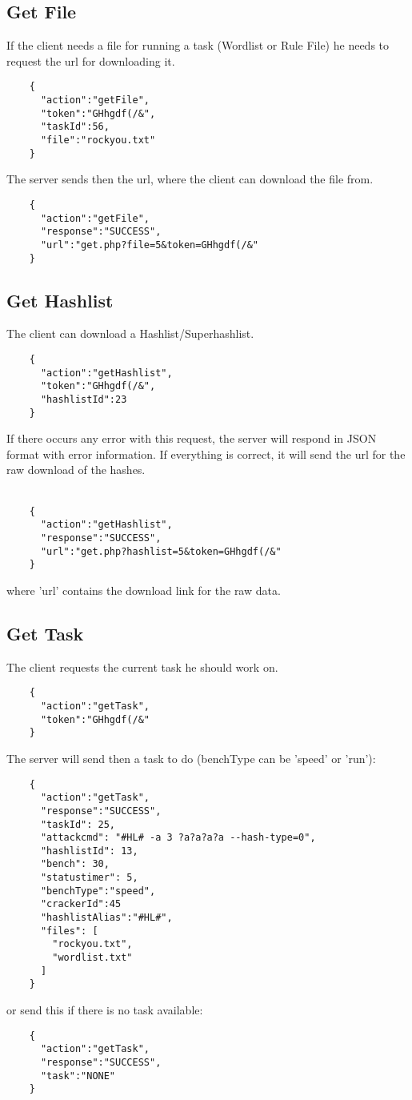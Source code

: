 \documentclass{article}
\begin{document}
	\subsection*{Get File}
	If the client needs a file for running a task (Wordlist or Rule File) he needs to request the url for downloading it.
	\begin{verbatim}
	{
	  "action":"getFile",
	  "token":"GHhgdf(/&",
	  "taskId":56,
	  "file":"rockyou.txt"
	}
	\end{verbatim}
	The server sends then the url, where the client can download the file from.
	\begin{verbatim}
	{
	  "action":"getFile",
	  "response":"SUCCESS",
	  "url":"get.php?file=5&token=GHhgdf(/&"
	}
	\end{verbatim}
	
	\subsection*{Get Hashlist}
	The client can download a Hashlist/Superhashlist.
	\begin{verbatim}
	{
	  "action":"getHashlist",
	  "token":"GHhgdf(/&",
	  "hashlistId":23
	}
	\end{verbatim}
	If there occurs any error with this request, the server will respond in JSON format with error information. If everything is correct, it will send the url for the raw download of the hashes.\\\\
	\begin{verbatim}
	{
	  "action":"getHashlist",
	  "response":"SUCCESS",
	  "url":"get.php?hashlist=5&token=GHhgdf(/&"
	}
	\end{verbatim}
	where 'url' contains the download link for the raw data.
	
	\subsection*{Get Task}
	The client requests the current task he should work on.
	\begin{verbatim}
	{
	  "action":"getTask",
	  "token":"GHhgdf(/&"
	}
	\end{verbatim}
	The server will send then a task to do (benchType can be 'speed' or 'run'):
	\begin{verbatim}
	{
	  "action":"getTask",
	  "response":"SUCCESS",
	  "taskId": 25,
	  "attackcmd": "#HL# -a 3 ?a?a?a?a --hash-type=0",
	  "hashlistId": 13,
	  "bench": 30,
	  "statustimer": 5,
	  "benchType":"speed",
	  "crackerId":45
	  "hashlistAlias":"#HL#",
	  "files": [
	    "rockyou.txt",
	    "wordlist.txt"
	  ]
	}
	\end{verbatim}
	or send this if there is no task available:
	\begin{verbatim}
	{
	  "action":"getTask",
	  "response":"SUCCESS",
	  "task":"NONE"
	}
	\end{verbatim}
	
\end{document}
